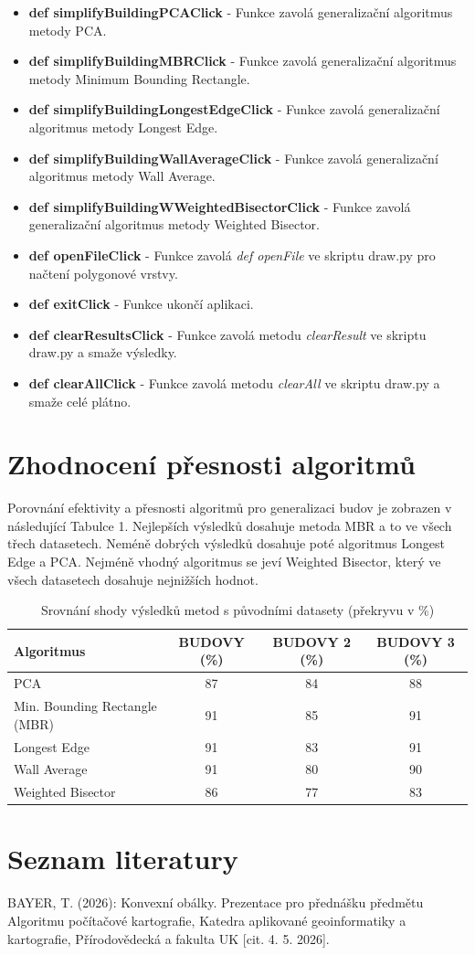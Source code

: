 \documentclass[12pt, a4paper]{article}
\begin{document}
\begin{itemize}
    \item \textbf{def simplifyBuildingPCAClick} - Funkce zavolá generalizační algoritmus metody PCA.
    \item \textbf{def simplifyBuildingMBRClick} - Funkce zavolá generalizační algoritmus metody Minimum Bounding Rectangle.
    \item \textbf{def simplifyBuildingLongestEdgeClick} - Funkce zavolá generalizační algoritmus metody Longest Edge.
    \item \textbf{def simplifyBuildingWallAverageClick} -  Funkce zavolá generalizační algoritmus metody Wall Average.
    \item \textbf{def simplifyBuildingWWeightedBisectorClick} -  Funkce zavolá generalizační algoritmus metody Weighted Bisector.
    \item \textbf{def openFileClick} - Funkce zavolá \textit{def openFile} ve skriptu draw.py pro načtení polygonové vrstvy.
    \item \textbf{def exitClick} - Funkce ukončí aplikaci.
    \item \textbf{def clearResultsClick} - Funkce zavolá metodu \textit{clearResult} ve skriptu draw.py a smaže výsledky.
    \item \textbf{def clearAllClick} - Funkce zavolá metodu \textit{clearAll} ve skriptu draw.py a smaže celé plátno.
\end{itemize}

\newpage
\section{Zhodnocení přesnosti algoritmů}
\vspace{5mm}
Porovnání efektivity a přesnosti algoritmů pro generalizaci budov je zobrazen v následující Tabulce 1. Nejlepších výsledků dosahuje metoda MBR a to ve všech třech datasetech. Neméně dobrých výsledků dosahuje poté algoritmus Longest Edge a PCA. Nejméně vhodný algoritmus se jeví Weighted Bisector, který ve všech datasetech dosahuje nejnižších hodnot. 
\begin{table}[h!]
\centering
\begin{tabular}{|l|c|c|c|}
\hline
\textbf{Algoritmus} & \textbf{BUDOVY (\%)} & \textbf{BUDOVY 2 (\%)} & \textbf{BUDOVY 3 (\%)} \\ \hline
PCA & 87 &  84 & 88  \\ \hline
Min. Bounding Rectangle (MBR) & 91 & 85 & 91  \\ \hline
Longest Edge & 91 & 83 & 91  \\ \hline
Wall Average & 91 & 80 & 90  \\ \hline
Weighted Bisector & 86 & 77 & 83  \\ \hline
\end{tabular}
\caption{Srovnání shody výsledků metod s původními datasety (překryvu v \%)}
\end{table}

\newpage
\section*{Seznam literatury}
\vspace{5mm}
\noindent BAYER, T. (2026): Konvexní obálky. Prezentace pro přednášku předmětu Algoritmu počítačové kartografie, Katedra aplikované geoinformatiky  a kartografie, Přírodovědecká a fakulta UK [cit. 4. 5. 2026].
\vspace{3mm}
\end{document}
